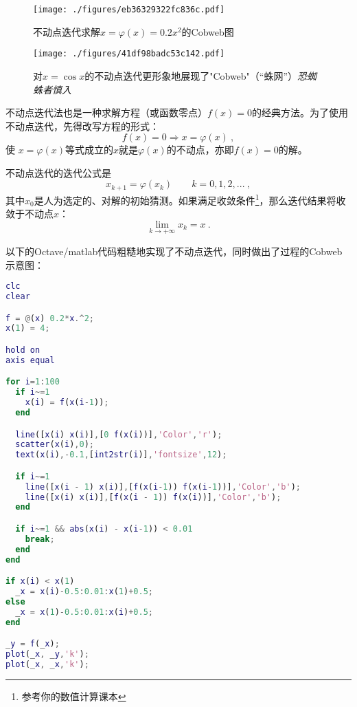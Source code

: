 
\begin{figure}[ht]
\centering
\texttt{[image: ./figures/eb36329322fc836c.pdf]}
\caption{不动点迭代求解$x=\varphi(x)=0.2x^2$的Cobweb图} \label{fig_FPIPLT_1}
\end{figure}

\begin{figure}[ht]
\centering
\texttt{[image: ./figures/41df98badc53c142.pdf]}
\caption{对$x=\cos x$的不动点迭代更形象地展现了"Cobweb"（“蛛网”）\textsl{恐蜘蛛者慎入}} \label{fig_FPIPLT_2}
\end{figure}

不动点迭代法也是一种求解方程（或函数零点）$f(x)=0$的经典方法。为了使用不动点迭代，先得改写方程的形式：
\begin{equation}
f(x)=0\Rightarrow x = \varphi(x)~,
\end{equation}
使 $x = \varphi(x)$等式成立的$x$就是$\varphi(x)$的不动点，亦即$f(x)=0$的解。

不动点迭代的迭代公式是
\begin{equation}
x_{k+1} = \varphi(x_k) \qquad k=0,1,2,...~,
\end{equation}
其中$x_0$是人为选定的、对解的初始猜测。如果满足收敛条件\footnote{参考你的数值计算课本}，那么迭代结果将收敛于不动点$x$：
$$\lim_{k\to+\infty} x_k = x~.$$

以下的Octave/matlab代码粗糙地实现了不动点迭代，同时做出了过程的Cobweb示意图：

\begin{lstlisting}[language=matlab]
clc
clear

f = @(x) 0.2*x.^2;
x(1) = 4;

hold on
axis equal

for i=1:100
  if i~=1
    x(i) = f(x(i-1));
  end

  line([x(i) x(i)],[0 f(x(i))],'Color','r');
  scatter(x(i),0);
  text(x(i),-0.1,[int2str(i)],'fontsize',12);

  if i~=1
    line([x(i - 1) x(i)],[f(x(i-1)) f(x(i-1))],'Color','b');
    line([x(i) x(i)],[f(x(i - 1)) f(x(i))],'Color','b');
  end

  if i~=1 && abs(x(i) - x(i-1)) < 0.01
    break;
  end
end

if x(i) < x(1)
  _x = x(i)-0.5:0.01:x(1)+0.5;
else
  _x = x(1)-0.5:0.01:x(i)+0.5;
end

_y = f(_x);
plot(_x, _y,'k');
plot(_x, _x,'k');
\end{lstlisting}
